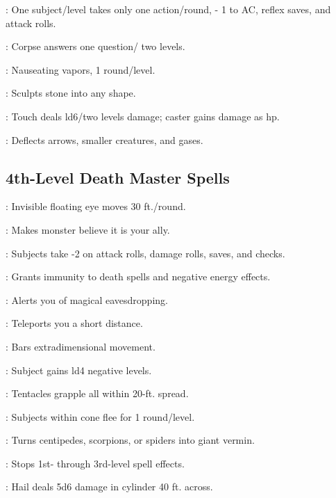 \begin{multicols}{2}
\begin{description*}
\item[\linkspell{Slow}:] One subject/level takes only one action/round, - 1 to AC, reflex saves, and attack rolls.
\item[\linkspell{Speak with Dead}:] Corpse answers one question/ two levels.
\item[\linkspell{Stinking Cloud}:] Nauseating vapors, 1 round/level.
\item[\linkspell{Stone Shape}:] Sculpts stone into any shape.
\item[\linkspell{Vampiric Touch}:] Touch deals ld6/two levels damage; caster gains damage as hp.
\item[\linkspell{Wind Wall}:] Deflects arrows, smaller creatures, and gases.
\end{description*}

\subsection{4th-Level Death Master Spells}
\begin{description*}
\item[\linkspell{Arcane Eye}:] Invisible floating eye moves 30 ft./round.
\item[\linkspell{Charm Monster}:] Makes monster believe it is your ally.
\item[\linkspell{Crushing Despair}:] Subjects take -2 on attack rolls, damage rolls, saves, and checks.
\item[\linkspell{Death Ward}:] Grants immunity to death spells and negative energy effects.
\item[\linkspell{Detect Scrying}:] Alerts you of magical eavesdropping.
\item[\linkspell{Dimension Door}:] Teleports you a short distance.
\item[\linkspell{Dimensional Anchor}:] Bars extradimensional movement.
\item[\linkspell{Enervation}:] Subject gains ld4 negative levels.
\item[\linkspell{Evard's Black Tentacles}:] Tentacles grapple all within 20-ft. spread.
\item[\linkspell{Fear}:] Subjects within cone flee for 1 round/level.
\item[\linkspell{Giant Vermin}:] Turns centipedes, scorpions, or spiders into giant vermin.
\item[\linkspell{Globe of Invulnerability, Lesser}:] Stops 1st- through 3rd-level spell effects.
\item[\linkspell{Ice Storm}:] Hail deals 5d6 damage in cylinder 40 ft. across.

\end{description*}
\end{multicols}
